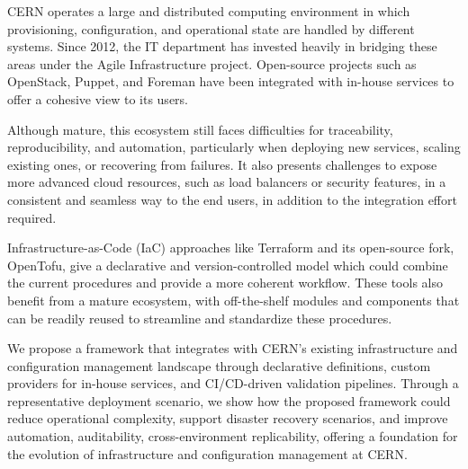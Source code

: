 CERN operates a large and distributed computing environment in which provisioning, configuration, and operational state are handled by different systems. Since 2012, the IT department has invested heavily in bridging these areas under the Agile Infrastructure project. Open-source projects such as OpenStack, Puppet, and Foreman have been integrated with in-house services to offer a cohesive view to its users.

Although mature, this ecosystem still faces difficulties for traceability, reproducibility, and automation, particularly when deploying new services, scaling existing ones, or recovering from failures. It also presents challenges to expose more advanced cloud resources, such as load balancers or security features, in a consistent and seamless way to the end users, in addition to the integration effort required.

Infrastructure-as-Code (IaC) approaches like Terraform and its open-source fork, OpenTofu, give a declarative and version-controlled model which could combine the current procedures and provide a more coherent workflow. These tools also benefit from a mature ecosystem, with off-the-shelf modules and components that can be readily reused to streamline and standardize these procedures.

We propose a framework that integrates with CERN’s existing infrastructure and configuration management landscape through declarative definitions, custom providers for in-house services, and CI/CD-driven validation pipelines. Through a representative deployment scenario, we show how the proposed framework could reduce operational complexity, support disaster recovery scenarios, and improve automation, auditability, cross-environment replicability, offering a foundation for the evolution of infrastructure and configuration management at CERN.
